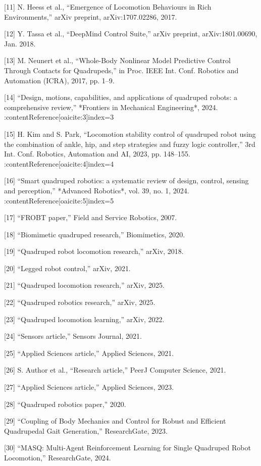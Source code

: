 [11] N. Heess et al., “Emergence of Locomotion Behaviours in Rich Environments,” arXiv preprint, arXiv:1707.02286, 2017.

[12] Y. Tassa et al., “DeepMind Control Suite,” arXiv preprint, arXiv:1801.00690, Jan. 2018.

[13] M. Neunert et al., “Whole-Body Nonlinear Model Predictive Control Through Contacts for Quadrupeds,” in Proc. IEEE Int. Conf. Robotics and Automation (ICRA), 2017, pp. 1–9.

[14] “Design, motions, capabilities, and applications of quadruped robots: a comprehensive review,” *Frontiers in Mechanical Engineering*, 2024. :contentReference[oaicite:3]{index=3}

[15] H. Kim and S. Park, “Locomotion stability control of quadruped robot using the combination of ankle, hip, and step strategies and fuzzy logic controller,” 3rd Int. Conf. Robotics, Automation and AI, 2023, pp. 148–155. :contentReference[oaicite:4]{index=4}

[16] “Smart quadruped robotics: a systematic review of design, control, sensing and perception,” *Advanced Robotics*, vol. 39, no. 1, 2024. :contentReference[oaicite:5]{index=5}

[17] “FROBT paper,” Field and Service Robotics, 2007.

[18] “Biomimetic quadruped research,” Biomimetics, 2020.

[19] “Quadruped robot locomotion research,” arXiv, 2018.

[20] “Legged robot control,” arXiv, 2021.

[21] “Quadruped locomotion research,” arXiv, 2025.

[22] “Quadruped robotics research,” arXiv, 2025.

[23] “Quadruped locomotion learning,” arXiv, 2022.

[24] “Sensors article,” Sensors Journal, 2021.

[25] “Applied Sciences article,” Applied Sciences, 2021.

[26] S. Author et al., “Research article,” PeerJ Computer Science, 2021.

[27] “Applied Sciences article,” Applied Sciences, 2023.

[28] “Quadruped robotics paper,” 2020.

[29] “Coupling of Body Mechanics and Control for Robust and Efficient Quadrupedal Gait Generation,” ResearchGate, 2023.

[30] “MASQ: Multi-Agent Reinforcement Learning for Single Quadruped Robot Locomotion,” ResearchGate, 2024.

